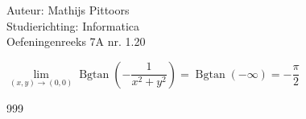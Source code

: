 \documentclass[a4paper]{article}
\newcommand{\llim}{\lim\limits}
\newcommand{\Bgtan}{\operatorname{Bgtan}}
\begin{document}
  
\noindent \large Auteur: Mathijs Pittoors \\
\noindent \large Studierichting: Informatica\\
\noindent \large Oefeningenreeks 7A nr. 1.20\\

\medskip

\normalsize

$ \llim_{(x,y) \rightarrow (0,0)} \Bgtan \left( - \dfrac{1}{x^2+y^2}\right) = \Bgtan(-\infty) = - \dfrac{\pi}{2}$

\begin{thebibliography}{999}
\end{thebibliography}
\end{document}
